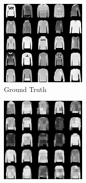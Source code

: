 \begin{figure}[H]
    \centering
    \begin{subfigure}[b]{0.24\textwidth}
        \centering
        \includegraphics[width=\textwidth]{figures/einsum/2fashion-mnist_ground_truth.png}
        \caption{Ground Truth}
    \end{subfigure}
    \begin{subfigure}[b]{0.24\textwidth}
        \centering
        \includegraphics[width=\textwidth]{figures/einsum/2fashion-mnist_EM.png}

\end{subfigure}
\end{figure}
